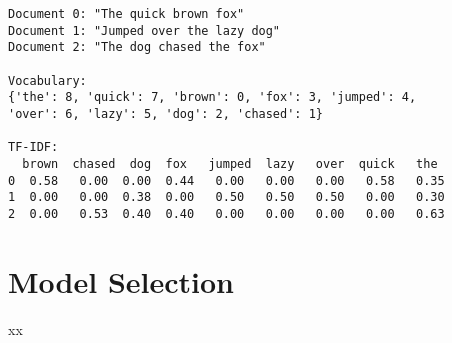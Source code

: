 \begin{verbatim}
Document 0: "The quick brown fox"
Document 1: "Jumped over the lazy dog"
Document 2: "The dog chased the fox"

Vocabulary: 
{'the': 8, 'quick': 7, 'brown': 0, 'fox': 3, 'jumped': 4,
'over': 6, 'lazy': 5, 'dog': 2, 'chased': 1}

TF-IDF:
  brown  chased  dog  fox   jumped  lazy   over  quick   the 
0  0.58   0.00  0.00  0.44   0.00   0.00   0.00   0.58   0.35  
1  0.00   0.00  0.38  0.00   0.50   0.50   0.50   0.00   0.30  
2  0.00   0.53  0.40  0.40   0.00   0.00   0.00   0.00   0.63   
\end{verbatim}

\section{Model Selection}

xx